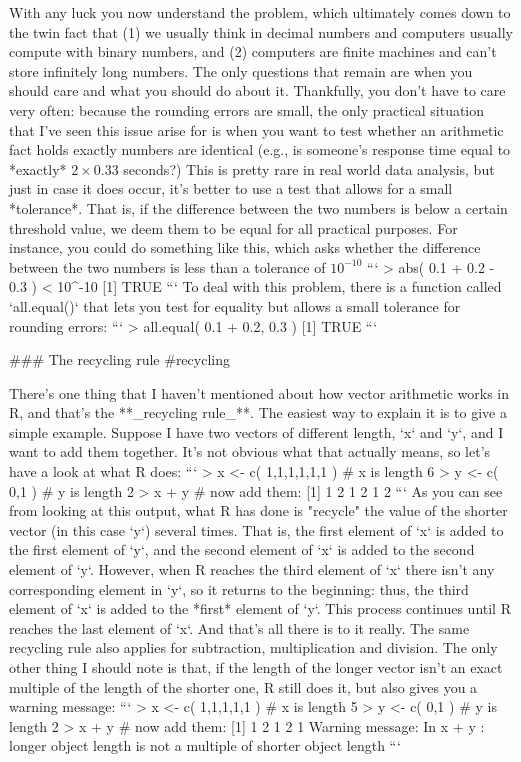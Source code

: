 With any luck you now understand the problem, which ultimately comes down to the twin fact that (1) we usually think in decimal numbers and computers usually compute with binary numbers, and (2) computers are finite machines and can't store infinitely long numbers. The only questions that remain are when you should care and what you should do about it. Thankfully, you don't have to care very often: because the rounding errors are small, the only practical situation that I've seen this issue arise for is when you want to test whether an arithmetic fact holds exactly numbers are identical (e.g., is someone's response time equal to *exactly* $2 \times 0.33$ seconds?) This is pretty rare in real world data analysis, but just in case it does occur, it's better to use a test that allows for a small *tolerance*. That is, if the difference between the two numbers is below a certain threshold value, we deem them to be equal for all practical purposes. For instance, you could do something like this, which asks whether the difference between the two numbers is less than a tolerance of $10^{-10}$
```
> abs( 0.1 + 0.2 - 0.3 ) < 10^-10
[1] TRUE
```
To deal with this problem, there is a function called `all.equal()` that lets you test for equality but allows a small tolerance for rounding errors:
```
> all.equal( 0.1 + 0.2, 0.3 )
[1] TRUE
```




### The recycling rule {#recycling}

There's one thing that I haven't mentioned about how vector arithmetic works in R, and that's the **_recycling rule_**. The easiest way to explain it is to give a simple example. Suppose I have two vectors of different length, `x` and `y`, and I want to add them together. It's not obvious what that actually means, so let's have a look at what R does:
```
> x <- c( 1,1,1,1,1,1 )  # x is length 6
> y <- c( 0,1 )          # y is length 2
> x + y                  # now add them:
[1] 1 2 1 2 1 2
```
As you can see from looking at this output, what R has done is "recycle" the value of the shorter vector (in this case `y`) several times. That is, the first element of `x` is added to the first element of `y`, and the second element of `x` is added to the second element of `y`. However, when R reaches the third element of `x` there isn't any corresponding element in `y`, so it returns to the beginning: thus, the third element of `x` is added to the *first* element of `y`. This process continues until R reaches the last element of `x`. And that's all there is to it really. The same recycling rule also applies for subtraction, multiplication and division. The only other thing I should note is that, if the length of the longer vector isn't an exact multiple of the length of the shorter one, R still does it, but also gives you a warning message:
```
> x <- c( 1,1,1,1,1 )    # x is length 5
> y <- c( 0,1 )          # y is length 2
> x + y                  # now add them:
[1] 1 2 1 2 1
Warning message:
In x + y : longer object length is not a multiple of shorter object length
```


